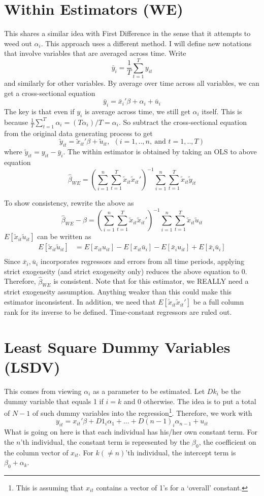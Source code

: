 \section{Within Estimators (WE)}
This shares a similar idea with First Difference in the sense that it attempts to weed out $\alpha_i$. This approach uses a different method. I will define new notations that involve variables that are averaged across time. Write 
\[
\bar{y}_i =\frac{1}{T}\sum_{t=1}^T y_{it}
\]
and similarly for other variables. By average over time across all variables, we can get a cross-sectional equation
\[
\bar{y}_i = \bar{x}_i'\beta + \alpha_i+\bar{u}_i
\]
The key is that even if $y_i$ is average across time, we still get $\alpha_i$ itself. This is because $\frac{1}{T}\sum_{t=1}^T\alpha_i = (T\alpha_i)/T=\alpha_i$. So subtract the cross-sectional equation from the original data generating process to get
\[
\tilde{y}_{it}= \tilde{x}_{it}'\beta+\tilde{u}_{it}, \ \ (i=1,..,n, \ \text{and } t=1,..,T)
\]
where $\tilde{y}_{it}=y_{it}-\bar{y}_i$. The within estimator is obtained by taking an OLS to above equation
\[
\hat{\beta}_{WE}=\left(\sum_{i=1}^n\sum_{t=1}^T \tilde{x}_{it}\tilde{x}_{it}'\right)^{-1}\sum_{i=1}^n\sum_{t=1}^T \tilde{x}_{it}\tilde{y}_{it}
\]
\par
To show consistency, rewrite the above as
\[
\hat{\beta}_{WE}-\beta=\left(\sum_{i=1}^n\sum_{t=1}^T \tilde{x}_{it}\tilde{x}_{it}'\right)^{-1}\sum_{i=1}^n\sum_{t=1}^T \tilde{x}_{it}\tilde{u}_{it}
\]
$E[\tilde{x}_{it}\tilde{u}_{it}]$ can be written as
\[
\begin{aligned}
E[\tilde{x}_{it}\tilde{u}_{it}]&=E[x_{it}u_{it}]-E[x_{it}\bar{u}_i]-E[\bar{x}_iu_{it}]+E[\bar{x}_i\bar{u}_i]\\
\end{aligned}
\] Since $\bar{x}_i, \bar{u}_i$ incorporates regressors and errors from all time periods, applying strict exogeneity (and strict exogeneity only) reduces the above equation to 0. Therefore, $\hat{\beta}_{WE}$ is consistent. Note that for this estimator, we REALLY need a strict exogeneity assumption. Anything weaker than this could make this estimator inconsistent. In addition, we need that $E\left[\tilde{x}_{it}\tilde{x}_{it}'\right]$ be a full column rank for its inverse to be defined. Time-constant regressors are ruled out. \par
\section{Least Square Dummy Variables (LSDV)}
This comes from viewing $\alpha_i$ as a parameter to be estimated. Let $Dk_i$ be the dummy variable that equals 1 if $i=k$ and 0 otherwise. The idea is to put a total of $N-1$ of such dummy variables into the regression\footnote{This is assuming that $x_{it}$ contains a vector of 1's for a `overall' constant.}. Therefore, we work with
\small{\[
y_{it}=x_{it}'\beta + D1_i\alpha_1+...+D(n-1)_i\alpha_{n-1}+u_{it} 
\]}\normalsize
What is going on here is that each individual has his/her own constant term. For the $n$'th individual, the constant term is represented by the $\beta_0$, the coefficient on the column vector of $x_{it}$. For $k(\neq n)$'th individual, the intercept term is $\beta_0 + \alpha_k$. 
